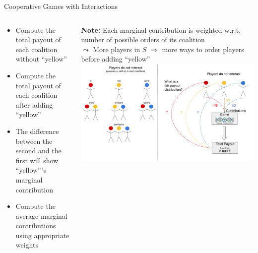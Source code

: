 \documentclass[11pt,compress,t,notes=noshow, aspectratio=169, xcolor=table]{beamer}
\begin{document}
\begin{frame}{Cooperative Games with Interactions}
\begin{columns}[T, totalwidth=\linewidth]
\begin{column}{0.53\textwidth}
\scriptsize
\begin{itemize}
\itemsep0em
    \item Compute the total payout of each coalition without \enquote{yellow}
    \item Compute the total payout of each coalition after adding \enquote{yellow}
    \item The difference between the second and the first will show \enquote{yellow}'s marginal contribution
    \item Compute the average marginal contributions using appropriate weights
\end{itemize}
\end{column}
\begin{column}{0.47\textwidth}
\pause
\textbf{Note:} Each marginal contribution is weighted w.r.t. number of possible orders of its coalition\\
$\leadsto$ More players in $S$ $\Rightarrow$ more ways to order players before adding \enquote{yellow}
\includegraphics[page=7, width = \textwidth, trim=182px 10px 0px 10px, clip]{figure/Shapley.pdf}
\end{column}
\end{columns}
\end{frame}

\end{document}
